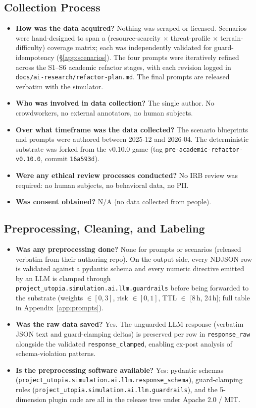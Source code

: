 \subsection{Collection Process}

\begin{itemize}[leftmargin=*]
\item \textbf{How was the data acquired?}
Nothing was scraped or licensed. Scenarios were hand-designed
to span a (resource-scarcity $\times$ threat-profile $\times$
terrain-difficulty) coverage matrix; each was independently
validated for guard-idempotency
(\S\ref{app:scenarios}). The four prompts were iteratively
refined across the S1--S6 academic refactor stages, with each
revision logged in
\texttt{docs/ai-research/refactor-plan.md}. The final
prompts are released verbatim with the simulator.
\item \textbf{Who was involved in data collection?}
The single author. No crowdworkers, no external annotators,
no human subjects.
\item \textbf{Over what timeframe was the data collected?}
The scenario blueprints and prompts were authored between
2025-12 and 2026-04. The deterministic substrate was forked
from the v0.10.0 game (tag \texttt{pre-academic-refactor-v0.10.0},
commit \texttt{16a593d}).
\item \textbf{Were any ethical review processes conducted?}
No IRB review was required: no human subjects, no
behavioral data, no PII.
\item \textbf{Was consent obtained?}
N/A (no data collected from people).
\end{itemize}

\subsection{Preprocessing, Cleaning, and Labeling}

\begin{itemize}[leftmargin=*]
\item \textbf{Was any preprocessing done?}
None for prompts or scenarios (released verbatim from their
authoring repo). On the output side, every NDJSON row is
validated against a pydantic schema and every numeric
directive emitted by an LLM is clamped through
\texttt{project\_utopia.simulation.ai.llm.guardrails}
before being forwarded to the substrate
(weights $\in [0,3]$, risk $\in [0,1]$, TTL $\in$
[8\,h, 24\,h]; full table in Appendix~\ref{app:prompts}).
\item \textbf{Was the raw data saved?}
Yes. The unguarded LLM response (verbatim JSON text and
guard-clamping deltas) is preserved per row in
\texttt{response\_raw} alongside the validated
\texttt{response\_clamped}, enabling ex-post analysis of
schema-violation patterns.
\item \textbf{Is the preprocessing software available?}
Yes: pydantic schemas
(\texttt{project\_utopia.simulation.ai.llm.response\_schema}),
guard-clamping rules
(\texttt{project\_utopia.simulation.ai.llm.guardrails}), and the
5-dimension plugin code are all in the release tree under
Apache 2.0 / MIT.
\end{itemize}

